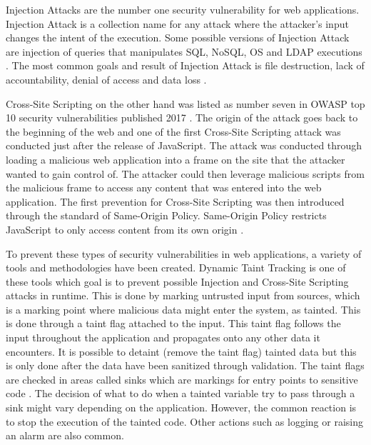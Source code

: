 \documentclass{../kththesis}
\begin{document}
	Injection Attacks are the number one security vulnerability for web applications. Injection Attack is a collection name for any attack where the attacker's input changes the intent of the execution. Some possible versions of Injection Attack are injection of queries that manipulates SQL, NoSQL, OS and LDAP executions \parencite{OWASP2017}. The most common goals and result of Injection Attack is file destruction, lack of accountability, denial of access and data loss \parencite{Secure_Web}.
	
	Cross-Site Scripting on the other hand was listed as number seven in OWASP top 10 security vulnerabilities published 2017 \parencite{OWASP2017}. The origin of the attack goes back to the beginning of the web and one of the first Cross-Site Scripting attack was conducted just after the release of JavaScript. The attack was conducted through loading a malicious web application into a frame on the site that the attacker wanted to gain control of. The attacker could then leverage malicious scripts from the malicious frame to access any content that was entered into the web application. The first prevention for Cross-Site Scripting was then introduced through the standard of Same-Origin Policy. Same-Origin Policy restricts JavaScript to only access content from its own origin \parencite{FogieSeth2007Xacs, w3csop}.
	
	To prevent these types of security vulnerabilities in web applications, a variety of tools and methodologies have been created. Dynamic Taint Tracking is one of these tools which goal is to prevent possible Injection and Cross-Site Scripting attacks in runtime. This is done by marking untrusted input from sources, which is a marking point where malicious data might enter the system, as tainted. This is done through a taint flag attached to the input. This taint flag follows the input throughout the application and propagates onto any other data it encounters. It is possible to detaint (remove the taint flag) tainted data but this is only done after the data have been sanitized through validation. The taint flags are checked in areas called sinks which are markings for entry points to sensitive code \parencite{Pan2015, Venkataramani2008}. The decision of what to do when a tainted variable try to pass through a sink might vary depending on the application. However, the common reaction is to stop the execution of the tainted code. Other actions such as logging or raising an alarm are also common. 
	
\end{document}
